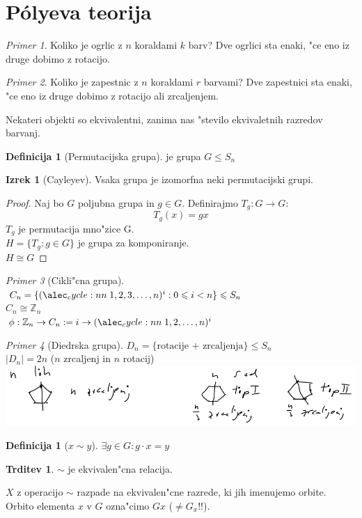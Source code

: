 \documentclass[a4paper,12pt]{article}
\theoremstyle{definition}
\newtheorem{defn}[counter]{Definicija}
\newtheorem{claim}[counter]{Trditev}
\newtheorem{theorem}[counter]{Izrek}
\theoremstyle{remark}
\newtheorem*{ex}{Primer}
\newcommand{\Z}{\mathbb{Z}}
\begin{document}
\section{P\'{o}lyeva teorija}
\begin{ex}
	Koliko je ogrlic z $n$ koraldami $k$ barv?
	Dve ogrlici sta enaki, "ce eno iz druge dobimo z rotacijo.
\end{ex}
\begin{ex}
	Koliko je zapestnic z $n$ koraldami $r$ barvami?
	Dve zapestnici sta enaki, "ce eno iz druge dobimo z rotacijo ali zrcaljenjem.
\end{ex}
Nekateri objekti so ekvivalentni, zanima nas "stevilo ekvivaletnih razredov barvanj.

\begin{defn}[Permutacijska grupa]
	je grupa $G \leqslant S_n$
\end{defn}
\begin{theorem}[Cayleyev]
	Vsaka grupa je izomorfna neki permutacijski grupi.
\end{theorem}
\begin{proof}
	Naj bo $G$ poljubna grupa in $g \in G$. Definirajmo $T_g: G \rightarrow G$:
	\[ T_g(x) = gx \]
	$T_g$ je permutacija mno"zice G. \\
	$H = \lbrace T_g: g \in G \rbrace$ je grupa za komponiranje. \\
	$H \cong G$
\end{proof}
\begin{ex}[Cikli"cna grupa]
	$C_n = \lbrace \cycle{1, 2, 3, \ldots, n}^i: 0 \leqslant i < n \rbrace \leqslant S_n$\\
	$C_n \cong \Z_n$\\
	$\phi: \Z_n \rightarrow C_n := i \rightarrow \cycle{1, 2, \ldots, n}^i$
\end{ex}

\begin{ex}[Diedrska grupa]
	$D_n = \lbrace \text{rotacije + zrcaljenja} \rbrace \leqslant S_n$\\
	$|D_n| = 2n$ ($n$ zrcaljenj in $n$ rotacij)
	\\
	\includegraphics{diedrska}
\end{ex}
\begin{defn}[$x \sim y$]
	$\exists g \in G: g \cdot x = y$
\end{defn}
\begin{claim}
	$\sim$ je ekvivalen"cna relacija.
\end{claim}
$X$ z operacijo $\sim$ razpade na ekvivalen"cne razrede, ki jih imenujemo orbite. Orbito elementa $x$ v $G$ ozna"cimo $Gx$ ($\neq G_x$!!).
\end{document}

